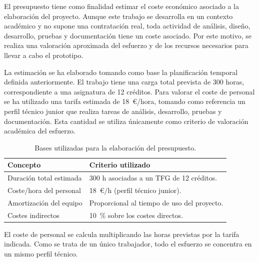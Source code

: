 El presupuesto tiene como finalidad estimar el coste económico asociado a la elaboración del proyecto. Aunque este trabajo se desarrolla en un contexto académico y no supone una contratación real, toda actividad de análisis, diseño, desarrollo, pruebas y documentación tiene un coste asociado. Por este motivo, se realiza una valoración aproximada del esfuerzo y de los recursos necesarios para llevar a cabo el prototipo.

La estimación se ha elaborado tomando como base la planificación temporal definida anteriormente. El trabajo tiene una carga total prevista de 300 horas, correspondiente a una asignatura de 12 créditos. Para valorar el coste de personal se ha utilizado una tarifa estimada de 18~\euro/hora, tomando como referencia un perfil técnico junior que realiza tareas de análisis, desarrollo, pruebas y documentación. Esta cantidad se utiliza únicamente como criterio de valoración académica del esfuerzo.

\begin{table}[h!]
\centering
\small
\begin{tabular}{|p{6cm}|p{8cm}|}
\hline
\textbf{Concepto} & \textbf{Criterio utilizado} \\ \hline
Duración total estimada & 300 h asociadas a un TFG de 12 créditos. \\ \hline
Coste/hora del personal & 18~\euro/h (perfil técnico junior). \\ \hline
Amortización del equipo & Proporcional al tiempo de uso del proyecto. \\ \hline
Costes indirectos       & 10~\% sobre los costes directos. \\ \hline
\end{tabular}
\caption{Bases utilizadas para la elaboración del presupuesto.}
\label{tab:bases-presupuesto}
\end{table}

El coste de personal se calcula multiplicando las horas previstas por la tarifa indicada. Como se trata de un único trabajador, todo el esfuerzo se concentra en un mismo perfil técnico.


